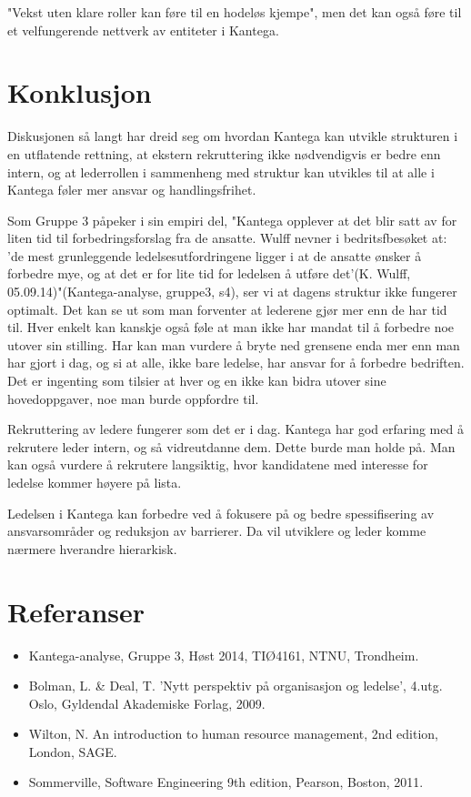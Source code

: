 \documentclass[12pt, a4paper]{article}
\begin{document}
"Vekst uten klare roller kan føre til en hodeløs kjempe", men det kan også føre
til et velfungerende nettverk av entiteter i Kantega. 

\section{Konklusjon}\label{konklusjon}

Diskusjonen så langt har dreid seg om hvordan Kantega kan utvikle strukturen i
en utflatende rettning, at ekstern rekruttering ikke nødvendigvis er bedre enn
intern, og at lederrollen i sammenheng med struktur kan utvikles til at alle i
Kantega føler mer ansvar og handlingsfrihet. 

Som Gruppe 3 påpeker i sin empiri del, "Kantega opplever at det blir satt av for liten tid til forbedringsforslag fra
de ansatte. Wulff nevner i bedritsfbesøket at: 'de mest grunleggende
ledelsesutfordringene ligger i at de ansatte ønsker å forbedre mye, og at det
er for lite tid for ledelsen å utføre det'(K. Wulff,
05.09.14)"(Kantega-analyse, gruppe3, s4), ser vi at
dagens struktur ikke fungerer optimalt. Det kan se ut som man forventer at
lederene gjør mer enn de har tid til. Hver enkelt kan kanskje også føle at man
ikke har mandat til å forbedre noe utover sin stilling. Har kan man vurdere å
bryte ned grensene enda mer enn man har gjort i dag, og si at alle, ikke bare
ledelse, har ansvar for å forbedre bedriften. Det er ingenting som tilsier at
hver og en ikke kan bidra utover sine hovedoppgaver, noe man burde oppfordre
til.

Rekruttering av ledere fungerer som det er i dag. Kantega har god erfaring med
å rekrutere leder intern, og så vidreutdanne dem. Dette burde man holde på. Man
kan også vurdere å rekrutere langsiktig, hvor kandidatene med interesse for
ledelse kommer høyere på lista.  

Ledelsen i Kantega kan forbedre ved å fokusere på og bedre
spessifisering av ansvarsområder og reduksjon av barrierer. Da vil utviklere og
leder komme nærmere hverandre hierarkisk.  


\section{Referanser}
\begin{itemize}
	\item Kantega-analyse, Gruppe 3, Høst 2014, TIØ4161, NTNU, Trondheim.
	\item Bolman, L. \& Deal, T. 'Nytt perspektiv på organisasjon og ledelse',
4.utg. Oslo, Gyldendal Akademiske Forlag, 2009. 
	\item Wilton, N. An introduction to human resource management, 2nd
edition, London, SAGE.
	\item Sommerville, Software Engineering 9th edition, Pearson, Boston, 2011.
\end{itemize}
\end{document}
